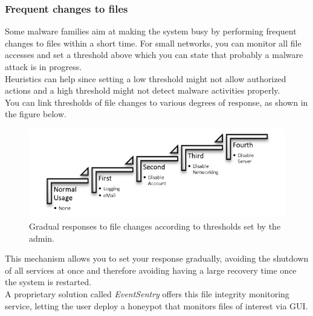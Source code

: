 \subsubsection{Frequent changes to files}
Some malware families aim at making the system busy by performing frequent changes to files within a short time. For small networks, you can monitor all file accesses and set a threshold above which you can state that probably a malware attack is in progress. \\
Heuristics can help since setting a low threshold might not allow authorized actions and a high threshold might not detect malware activities properly.\\
You can link thresholds of file changes to various degrees of response, as shown in the figure below.

\begin{figure}[ht!]
\centering
\includegraphics[width = 14cm]{images/responses.jpg}
\caption{ Gradual responses to file changes according to thresholds set by the admin.}
\label{fig:irradiances}
\end{figure}
\FloatBarrier

\noindent This mechanism allows you to set your response gradually, avoiding the shutdown of all services at once and therefore avoiding having a large recovery time once the system is restarted.\\
A proprietary solution called \textit{EventSentry} offers this file integrity monitoring service, letting the user deploy a honeypot that monitors files of interest via GUI.

